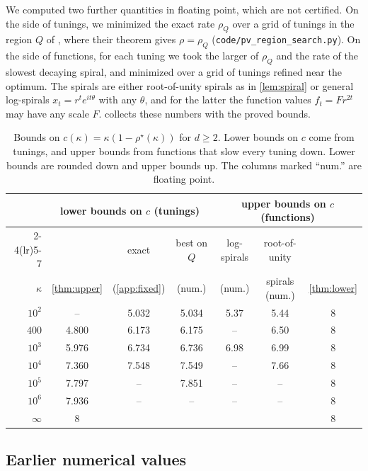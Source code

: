 \documentclass[11pt, a4paper]{article}
\newcommand{\file}{\nolinkurl}  %
\theoremstyle{definition}
\begin{document}
We computed two further quantities in floating point, which are not certified. On the side of tunings, we minimized the exact
rate $\rho_Q$ over a grid of tunings in the region $Q$ of \citet[Thm.~7.2(b)]{pasechniuk2026two}, where their theorem
gives $\rho=\rho_Q$ (\file{code/pv_region_search.py}). On the side of functions, for each tuning we took the larger of
$\rho_Q$ and the rate of the slowest decaying spiral, and minimized over a grid of tunings refined near the optimum.
The spirals are either root-of-unity spirals as in \cref{lem:spiral} or general log-spirals $x_t=r^te^{it\theta}$ with
any $\theta$, and for the latter the function values $f_t=Fr^{2t}$ may have any scale $F$.  collects
these numbers with the proved bounds.

\begin{table}[ht]
  \centering
  \caption{Bounds on $c(\kappa)=\kappa(1-\rho^\star(\kappa))$ for $d\ge2$. Lower bounds on $c$ come from tunings, and
    upper bounds from functions that slow every tuning down. Lower bounds are rounded down and upper bounds up. The
    columns marked ``num.'' are floating point.}
  \label{tab:bracket}
  \small
  \begin{tabular}{rcccccc}
    \toprule
    & \multicolumn{3}{c}{lower bounds on $c$ (tunings)} & \multicolumn{3}{c}{upper bounds on $c$ (functions)} \\
    \cmidrule(lr){2-4}\cmidrule(lr){5-7}
    & & exact & best on $Q$ & log-spirals & root-of-unity & \\
    $\kappa$ & \cref{thm:upper} & (\cref{app:fixed}) & (num.) & (num.) & spirals (num.) & \cref{thm:lower} \\
    \midrule
    $10^2$ & -- & 5.032 & 5.034 & 5.37 & 5.44 & 8 \\
    $400$ & 4.800 & 6.173 & 6.175 & -- & 6.50 & 8 \\
    $10^3$ & 5.976 & 6.734 & 6.736 & 6.98 & 6.99 & 8 \\
    $10^4$ & 7.360 & 7.548 & 7.549 & -- & 7.66 & 8 \\
    $10^5$ & 7.797 & -- & 7.851 & -- & -- & 8 \\
    $10^6$ & 7.936 & -- & -- & -- & -- & 8 \\
    $\infty$ & 8 & & & & & 8 \\
    \bottomrule
  \end{tabular}
\end{table}

\subsection{Earlier numerical values}
\label{sec:earlier}
\end{document}
